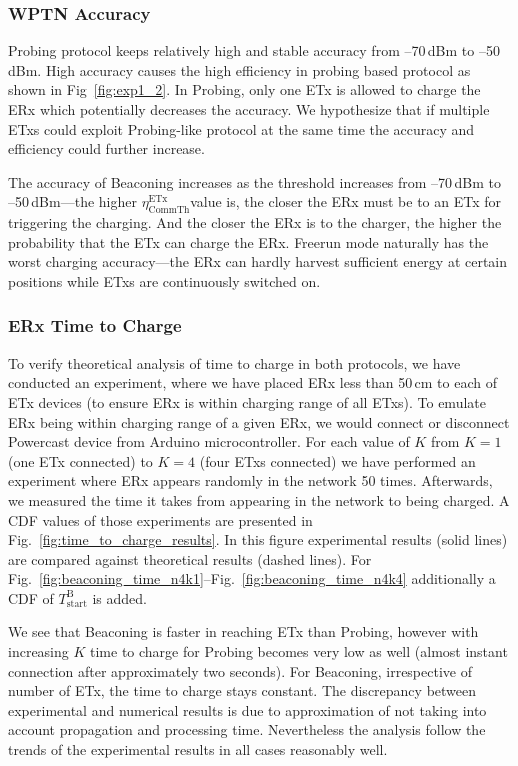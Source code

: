 \documentclass[11pt,draftclsnofoot,journal,onecolumn]{IEEEtran}
\newcommand{\txRssiThreshold}{$\eta^\text{ETx}_\text{CommTh}$}
\begin{document}
\subsubsection{WPTN Accuracy}
\label{sec:accuracy_los}

Probing protocol keeps relatively high and stable accuracy from --70\,dBm to --50\,dBm. High accuracy causes the high efficiency in probing based protocol as shown in Fig~\ref{fig:exp1_2}. In Probing, only one ETx is allowed to charge the ERx which potentially decreases the accuracy. We hypothesize that if multiple ETxs could exploit Probing-like protocol at the same time the accuracy and efficiency could further increase.

The accuracy of Beaconing increases as the threshold increases from --70\,dBm to --50\,dBm---the higher \txRssiThreshold value is, the closer the ERx must be to an ETx for triggering the charging. And the closer the ERx is to the charger, the higher the probability that the ETx can charge the ERx. Freerun mode naturally has the worst charging accuracy---the ERx can hardly harvest sufficient energy at certain positions while ETxs are continuously switched on.

\subsubsection{ERx Time to Charge}

To verify theoretical analysis of time to charge in both protocols, we have conducted an experiment, where we have placed ERx less than 50\,cm to each of ETx devices (to ensure ERx is within charging range of all ETxs). To emulate ERx being within charging range of a given ERx, we would connect or disconnect Powercast device from Arduino microcontroller. For each value of $K$ from $K=1$ (one ETx connected) to $K=4$ (four ETxs connected) we have performed an experiment where ERx appears randomly in the network 50 times. Afterwards, we measured the time it takes from appearing in the network to being charged. A CDF values of those experiments are presented in Fig.~\ref{fig:time_to_charge_results}. In this figure experimental results (solid lines) are compared against theoretical results (dashed lines). For Fig.~\ref{fig:beaconing_time_n4k1}--Fig.~\ref{fig:beaconing_time_n4k4} additionally a CDF of $T^{\text{B}}_{\text{start}}$ is added.

We see that Beaconing is faster in reaching ETx than Probing, however with increasing $K$ time to charge for Probing becomes very low as well (almost instant connection after approximately two seconds). For Beaconing, irrespective of number of ETx, the time to charge stays constant. The discrepancy between experimental and numerical results is due to approximation of not taking into account propagation and processing time. Nevertheless the analysis follow the trends of the experimental results in all cases reasonably well.
\end{document}
